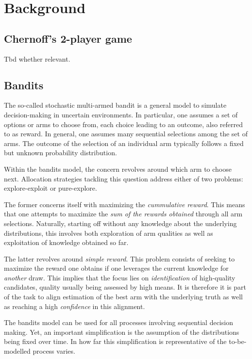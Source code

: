 \chapter{Background}

\section{Chernoff's 2-player game}
Tbd whether relevant.

\section{Bandits}
The so-called stochastic multi-armed bandit is a general model to simulate decision-making in uncertain environments.
In particular, one assumes a set of options or arms to choose from, each choice leading to an outcome, also referred to as reward. In general, one assumes many sequential selections among the set of arms. The outcome of the selection of an individual arm typically follows a fixed but unknown probability distribution.

Within the bandits model, the concern revolves around which arm to choose next. Allocation strategies tackling this question address either of two problems: explore-exploit or pure-explore.

The former concerns itself with maximizing the \emph{cummulative reward}. This means that one attempts to maximize the \emph{sum of the rewards obtained} through all arm selections. Naturally, starting off without any knowledge about the underlying distributions, this involves both exploration of arm qualities as well as exploitation of knowledge obtained so far.

The latter revolves around \emph{simple reward}. This problem consists of seeking to maximize the reward one obtains if one leverages the current knowledge for \emph{another} draw. This implies that the focus lies on \emph{identification} of high-quality candidates, quality usually being assessed by high means. It is therefore it is part of the task to align estimation of the best arm with the underlying truth as well as reaching a high \emph{confidence} in this alignment.

The bandits model can be used for all processes involving sequential decision making. Yet, an important simplification is the assumption of the distributions being fixed over time. In how far this simplification is representative of the to-be-modelled process varies.


